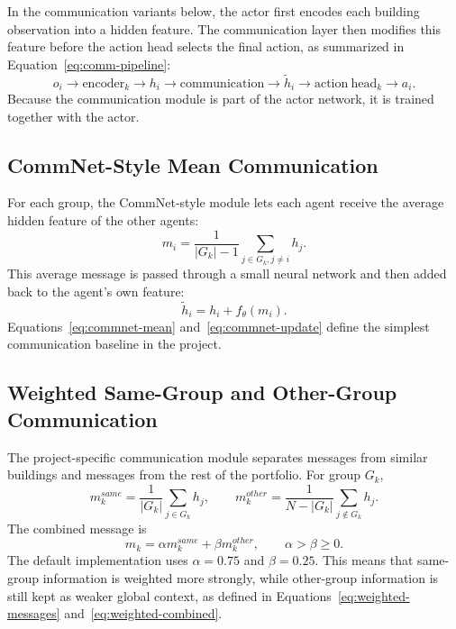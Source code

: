 In the communication variants below, the actor first encodes each building
observation into a hidden feature. The communication layer then modifies this
feature before the action head selects the final action, as summarized in
Equation~\eqref{eq:comm-pipeline}:
\begin{equation}
\label{eq:comm-pipeline}
o_i \rightarrow \mathrm{encoder}_k \rightarrow h_i
\rightarrow \mathrm{communication} \rightarrow \tilde{h}_i
\rightarrow \mathrm{action\ head}_k \rightarrow a_i .
\end{equation}
Because the communication module is part of the actor network, it is trained
together with the actor.

\subsection{CommNet-Style Mean Communication}

For each group, the CommNet-style module lets each agent receive the average
hidden feature of the other agents:
\begin{equation}
\label{eq:commnet-mean}
m_i = \frac{1}{|G_k|-1}\sum_{j \in G_k, j \ne i} h_j .
\end{equation}
This average message is passed through a small neural network and then added
back to the agent's own feature:
\begin{equation}
\label{eq:commnet-update}
\tilde{h}_i = h_i + f_\theta(m_i).
\end{equation}
Equations~\eqref{eq:commnet-mean} and~\eqref{eq:commnet-update} define the
simplest communication baseline in the project.

\subsection{Weighted Same-Group and Other-Group Communication}

The project-specific communication module separates messages from similar
buildings and messages from the rest of the portfolio. For group $G_k$,
\begin{equation}
\label{eq:weighted-messages}
m^{same}_k = \frac{1}{|G_k|}\sum_{j \in G_k} h_j,
\qquad
m^{other}_k = \frac{1}{N-|G_k|}\sum_{j \notin G_k} h_j .
\end{equation}
The combined message is
\begin{equation}
\label{eq:weighted-combined}
m_k = \alpha m^{same}_k + \beta m^{other}_k,
\qquad \alpha > \beta \geq 0.
\end{equation}
The default implementation uses $\alpha=0.75$ and $\beta=0.25$. This means that
same-group information is weighted more strongly, while other-group information
is still kept as weaker global context, as defined in
Equations~\eqref{eq:weighted-messages} and~\eqref{eq:weighted-combined}.

